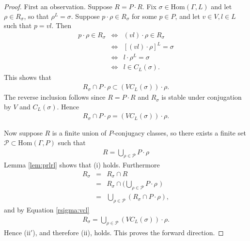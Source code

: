 \documentclass[12pt, a4paper]{amsart}
\numberwithin{equation}{section}
\theoremstyle{definition}
\theoremstyle{remark}
\theoremstyle{remark}
\begin{document}
\begin{proof}
First an observation. Suppose $R = P \cdot R$. Fix $\sigma \in \mathrm{Hom}(\Gamma, L)$ and let $\rho \in R_\sigma$, so that $\rho^L = \sigma$. Suppose $p \cdot \rho \in R_\sigma$ for some $p \in P$, and let $v \in V, l \in L$ such that $p = vl$. Then
\begin{eqnarray}
p \cdot \rho \in R_\sigma &\Leftrightarrow& (vl) \cdot \rho \in R_\sigma \\
&\Leftrightarrow& \left[(vl) \cdot \rho \right]^L = \sigma \\
&\Leftrightarrow& l \cdot \rho^L = \sigma \\
&\Leftrightarrow& l \in C_L(\sigma).
\end{eqnarray}
This shows that
\begin{eqnarray}
R_\sigma \cap P \cdot \rho \subset \left(VC_L(\sigma)\right) \cdot \rho.
\end{eqnarray}
The reverse inclusion follows since $R = P \cdot R$ and $R_\sigma$ is stable under conjugation by $V$ and $C_L(\sigma)$. Hence
\begin{eqnarray} \label{rsigma:vcl}
R_\sigma \cap P \cdot \rho = \left(VC_L(\sigma)\right) \cdot \rho.
\end{eqnarray}


Now suppose $R$ is a finite union of $P$-conjugacy classes, so there exists a finite set $\mathscr{P} \subset \mathrm{Hom}(\Gamma, P)$ such that
\begin{eqnarray} R = \bigcup_{\rho \in \mathscr{P}} P \cdot \rho \end{eqnarray}
Lemma \ref{lem:prlrl} shows that (i) holds. Furthermore
\begin{eqnarray} R_\sigma &=& R_\sigma \cap R \\
&=& R_\sigma \cap \big( \bigcup_{\rho \in \mathscr{P}} P \cdot \rho \,\,\big) \\
&=& \bigcup_{\rho \in \mathscr{P}} \left( R_\sigma \cap P \cdot \rho \right),
\end{eqnarray}
and by Equation \ref{rsigma:vcl}
\begin{eqnarray} R_\sigma = \bigcup_{\rho \in \mathscr{P}} (VC_L(\sigma)) \cdot \rho. \end{eqnarray}
Hence (ii$'$), and therefore (ii), holds. This proves the forward direction.



\end{proof}
\end{document}
